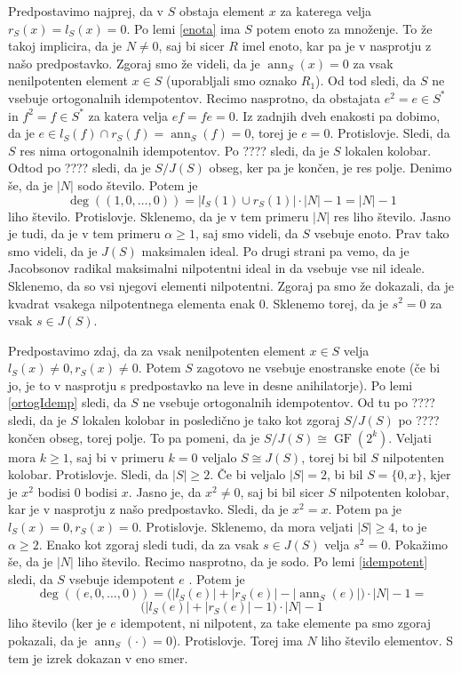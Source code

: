 \documentclass[a4paper, 12pt]{amsart}
\theoremstyle{definition} %
\theoremstyle{plain} %
\DeclareMathOperator{\ann}{ann}
\DeclareMathOperator{\GF}{GF}
\begin{document}
Predpostavimo najprej, da v $S$ obstaja element $x$ za katerega velja $r_S(x) = l_S(x) = 0$. Po lemi \ref{enota} ima $S$ potem enoto za množenje. To že takoj implicira, da je $N\neq 0$, saj bi sicer $R$ imel enoto, kar pa je v nasprotju z našo predpostavko. Zgoraj smo že videli, da je $\ann_S(x) = 0$ za vsak nenilpotenten element $x\in S$ (uporabljali smo oznako $R_1$). Od tod sledi, da $S$ ne vsebuje ortogonalnih idempotentov. Recimo nasprotno, da obstajata $e^2 = e\in S^*$ in $f^2 = f\in S^*$ za katera velja $ef = fe=0$. Iz zadnjih dveh enakosti pa dobimo, da je $e\in l_S(f) \cap r_S(f) =\ann_S(f) = 0$, torej je $e=0$. Protislovje. Sledi, da $S$ res nima ortogonalnih idempotentov. Po ???? sledi, da je $S$ lokalen kolobar. Odtod po ???? sledi, da je $S/J(S)$ obseg, ker pa je končen, je res polje. Denimo še, da je $|N|$ sodo število. Potem je 
$$
\deg((1,0,\dots,0)) = |l_S(1)\cup r_S(1)|\cdot |N| - 1 = |N| - 1
$$
liho število. Protislovje. Sklenemo, da je v tem primeru $|N|$ res liho število. Jasno je tudi, da je v tem primeru $\alpha \ge 1$, saj smo videli, da $S$ vsebuje enoto. Prav tako smo videli, da je $J(S)$ maksimalen ideal. Po drugi strani pa vemo, da je Jacobsonov radikal maksimalni nilpotentni ideal in da vsebuje vse nil ideale. Sklenemo, da so vsi njegovi elementi nilpotentni. Zgoraj pa smo že dokazali, da je kvadrat vsakega nilpotentnega elementa enak 0. Sklenemo torej, da je $s^2 = 0$ za vsak $s\in J(S)$.

Predpostavimo zdaj, da za vsak nenilpotenten element $x \in S$ velja $l_S(x) \neq 0, r_S(x) \neq 0$. Potem $S$ zagotovo ne vsebuje enostranske enote (če bi jo, je to v nasprotju s predpostavko na leve in desne anihilatorje). Po lemi \ref{ortogIdemp} sledi, da $S$ ne vsebuje ortogonalnih idempotentov. Od tu po ???? sledi, da je $S$ lokalen kolobar in posledično je tako kot zgoraj $S/J(S)$ po ???? končen obseg, torej polje. To pa pomeni, da je $S/J(S) \cong \GF(2^k)$. Veljati mora $k\ge 1$, saj bi v primeru $k=0$ veljalo $S \cong J(S)$, torej bi bil $S$ nilpotenten kolobar. Protislovje. Sledi, da $|S| \ge 2$. Če bi veljalo $|S| = 2$, bi bil $S=\{0,x\}$, kjer je $x^2$ bodisi $0$ bodisi $x$. Jasno je, da $x^2 \neq 0$, saj bi bil sicer $S$ nilpotenten kolobar, kar je v nasprotju z našo predpostavko. Sledi, da je $x^2 = x$. Potem pa je $l_S(x) = 0, r_S(x) = 0$. Protislovje. Sklenemo, da mora veljati $|S| \ge 4$, to je $\alpha \ge 2$. Enako kot zgoraj sledi tudi, da za vsak $ s \in J(S)$ velja $s^2 = 0$. Pokažimo še, da je $|N| $ liho število. Recimo nasprotno, da je sodo. Po lemi \ref{idempotent} sledi, da $S$ vsebuje idempotent $e$ . Potem je 
$$
\deg((e,0,\dots,0)) = \big(|l_S(e)| + |r_S(e)| - |\ann_S(e)| \big)\cdot |N| -1 =
$$
$$
 \big(|l_S(e)| + |r_S(e)| - 1 \big)\cdot |N| -1
$$
liho število (ker je $e$ idempotent, ni nilpotent, za take elemente pa smo zgoraj pokazali, da je $\ann_S(\cdot) = 0$). Protislovje. Torej ima $N$ liho število elementov. S tem je izrek dokazan v eno smer.
\end{document}
